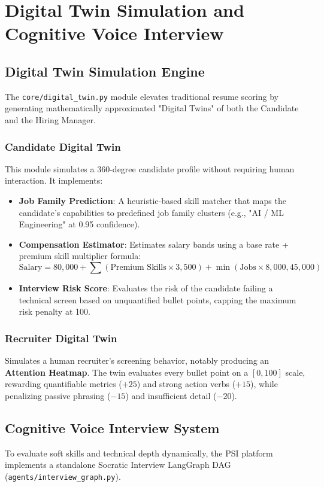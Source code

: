 \section{Digital Twin Simulation and Cognitive Voice Interview}\label{sec:digital_twin}

\subsection{Digital Twin Simulation Engine}
The \texttt{core/digital\_twin.py} module elevates traditional resume scoring by generating mathematically approximated "Digital Twins" of both the Candidate and the Hiring Manager.

\subsubsection{Candidate Digital Twin}
This module simulates a 360-degree candidate profile without requiring human interaction. It implements:
\begin{itemize}
    \item \textbf{Job Family Prediction}: A heuristic-based skill matcher that maps the candidate's capabilities to predefined job family clusters (e.g., "AI / ML Engineering" at 0.95 confidence).
    \item \textbf{Compensation Estimator}: Estimates salary bands using a base rate + premium skill multiplier formula: 
    \begin{equation}
        \text{Salary} = 80,000 + \sum(\text{Premium Skills} \times 3,500) + \min(\text{Jobs} \times 8,000, 45,000)
    \end{equation}
    \item \textbf{Interview Risk Score}: Evaluates the risk of the candidate failing a technical screen based on unquantified bullet points, capping the maximum risk penalty at 100.
\end{itemize}

\subsubsection{Recruiter Digital Twin}
Simulates a human recruiter's screening behavior, notably producing an \textbf{Attention Heatmap}. The twin evaluates every bullet point on a $[0, 100]$ scale, rewarding quantifiable metrics ($+25$) and strong action verbs ($+15$), while penalizing passive phrasing ($-15$) and insufficient detail ($-20$).

\subsection{Cognitive Voice Interview System}
To evaluate soft skills and technical depth dynamically, the PSI platform implements a standalone Socratic Interview LangGraph DAG (\texttt{agents/interview\_graph.py}).

